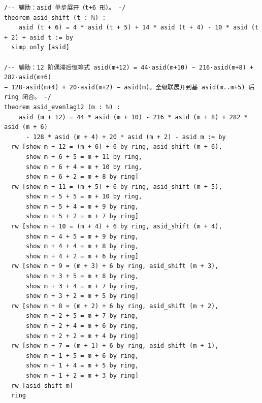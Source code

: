 \documentclass[11pt]{article}
\theoremstyle{definition}
\begin{document}
\begin{lstlisting}[caption={The auxiliary lemmas \texttt{asid\_shift} and \texttt{asid\_evenlag12} with complete proofs, verbatim from \texttt{final}\allowbreak/\texttt{01-comb08-sidemid-proved.lean} (lines 80--115, sha256 \texttt{19b5c390}). These two declarations are proof-body scaffolding added after the freeze and therefore do not occur in the frozen statement file.},label={lst:proof-aux}]
/-- 辅助：asid 单步展开（t+6 形）。 -/
theorem asid_shift (t : ℕ) :
    asid (t + 6) = 4 * asid (t + 5) + 14 * asid (t + 4) - 10 * asid (t + 2) + asid t := by
  simp only [asid]

/-- 辅助：12 阶偶滞后恒等式 asid(m+12) = 44·asid(m+10) − 216·asid(m+8) + 282·asid(m+6)
− 128·asid(m+4) + 20·asid(m+2) − asid(m)。全级联展开到基 asid(m..m+5) 后 ring 闭合。 -/
theorem asid_evenlag12 (m : ℕ) :
    asid (m + 12) = 44 * asid (m + 10) - 216 * asid (m + 8) + 282 * asid (m + 6)
      - 128 * asid (m + 4) + 20 * asid (m + 2) - asid m := by
  rw [show m + 12 = (m + 6) + 6 by ring, asid_shift (m + 6),
      show m + 6 + 5 = m + 11 by ring,
      show m + 6 + 4 = m + 10 by ring,
      show m + 6 + 2 = m + 8 by ring]
  rw [show m + 11 = (m + 5) + 6 by ring, asid_shift (m + 5),
      show m + 5 + 5 = m + 10 by ring,
      show m + 5 + 4 = m + 9 by ring,
      show m + 5 + 2 = m + 7 by ring]
  rw [show m + 10 = (m + 4) + 6 by ring, asid_shift (m + 4),
      show m + 4 + 5 = m + 9 by ring,
      show m + 4 + 4 = m + 8 by ring,
      show m + 4 + 2 = m + 6 by ring]
  rw [show m + 9 = (m + 3) + 6 by ring, asid_shift (m + 3),
      show m + 3 + 5 = m + 8 by ring,
      show m + 3 + 4 = m + 7 by ring,
      show m + 3 + 2 = m + 5 by ring]
  rw [show m + 8 = (m + 2) + 6 by ring, asid_shift (m + 2),
      show m + 2 + 5 = m + 7 by ring,
      show m + 2 + 4 = m + 6 by ring,
      show m + 2 + 2 = m + 4 by ring]
  rw [show m + 7 = (m + 1) + 6 by ring, asid_shift (m + 1),
      show m + 1 + 5 = m + 6 by ring,
      show m + 1 + 4 = m + 5 by ring,
      show m + 1 + 2 = m + 3 by ring]
  rw [asid_shift m]
  ring
\end{lstlisting}
\end{document}
